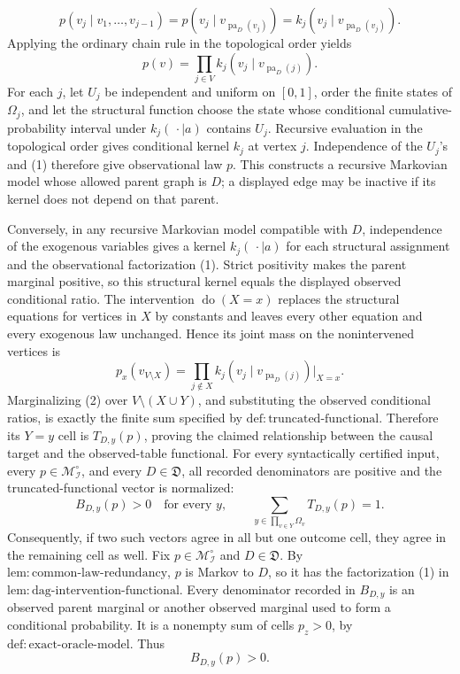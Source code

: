 \[
 p(v_j\mid v_1,\ldots,v_{j-1})
 =p(v_j\mid v_{\operatorname{pa}_D(v_j)})
 =k_j(v_j\mid v_{\operatorname{pa}_D(v_j)}).
\]
Applying the ordinary chain rule in the topological order yields
\[
 p(v)=\prod_{j\in V}k_j(v_j\mid v_{\operatorname{pa}_D(j)}). \tag{1}
\]
For each \(j\), let \(U_j\) be independent and uniform on \([0,1]\), order the finite states of \(\Omega_j\), and let the structural function choose the state whose conditional cumulative-probability interval under \(k_j(\,\cdot\mid a)\) contains \(U_j\).  Recursive evaluation in the topological order gives conditional kernel \(k_j\) at vertex \(j\).  Independence of the \(U_j\)'s and (1) therefore give observational law \(p\).  This constructs a recursive Markovian model whose allowed parent graph is \(D\); a displayed edge may be inactive if its kernel does not depend on that parent.

Conversely, in any recursive Markovian model compatible with \(D\), independence of the exogenous variables gives a kernel \(k_j(\,\cdot\mid a)\) for each structural assignment and the observational factorization (1).  Strict positivity makes the parent marginal positive, so this structural kernel equals the displayed observed conditional ratio.  The intervention \(\operatorname{do}(X=x)\) replaces the structural equations for vertices in \(X\) by constants and leaves every other equation and every exogenous law unchanged.  Hence its joint mass on the nonintervened vertices is
\[
 p_x(v_{V\setminus X})
 =\prod_{j\notin X}k_j(v_j\mid v_{\operatorname{pa}_D(j)})\big|_{X=x}. \tag{2}
\]
Marginalizing (2) over \(V\setminus(X\cup Y)\), and substituting the observed conditional ratios, is exactly the finite sum specified by \(\mathrm{def{:}truncated\text{-}functional}\).  Therefore its \(Y=y\) cell is \(T_{D,y}(p)\), proving the claimed relationship between the causal target and the observed-table functional.
For every syntactically certified input, every \(p\in\mathcal M_{\mathcal I}^{\circ}\), and every \(D\in\mathfrak D\), all recorded denominators are positive and the truncated-functional vector is normalized:
\[
 B_{D,y}(p)>0\quad\text{for every }y,
 \qquad
 \sum_{y\in\prod_{v\in Y}\Omega_v}T_{D,y}(p)=1.
\]
Consequently, if two such vectors agree in all but one outcome cell, they agree in the remaining cell as well.
Fix \(p\in\mathcal M_{\mathcal I}^{\circ}\) and \(D\in\mathfrak D\).  By \(\mathrm{lem{:}common\text{-}law\text{-}redundancy}\), \(p\) is Markov to \(D\), so it has the factorization (1) in \(\mathrm{lem{:}dag\text{-}intervention\text{-}functional}\).  Every denominator recorded in \(B_{D,y}\) is an observed parent marginal or another observed marginal used to form a conditional probability.  It is a nonempty sum of cells \(p_z>0\), by \(\mathrm{def{:}exact\text{-}oracle\text{-}model}\).  Thus
\[
 B_{D,y}(p)>0. \tag{3}
\]

